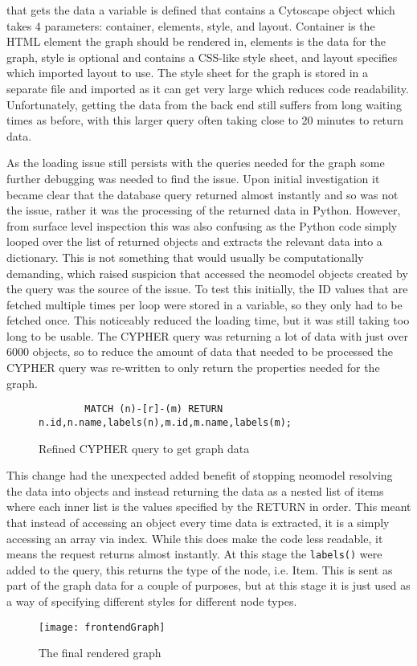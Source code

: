 that gets the data a variable is defined that contains a Cytoscape object which takes 4 parameters: container, elements, 
style, and layout. Container is the HTML element the graph should be rendered in, elements is the data for the graph, style is optional and contains a 
CSS-like style sheet, and layout specifies which imported layout to use. The style sheet for the graph is stored in a separate file and imported as 
it can get very large which reduces code readability. Unfortunately, getting the data from the back end still suffers from long waiting times as before, 
with this larger query often taking close to 20 minutes to return data.

As the loading issue still persists with the queries needed for the graph some further debugging was needed to find the issue. 
Upon initial investigation it became clear that the database query returned almost instantly and so was not the issue, rather it was the 
processing of the returned data in Python. However, from surface level inspection this was also confusing as the Python code simply looped 
over the list of returned objects and extracts the relevant data into a dictionary. This is not something that would usually be computationally demanding, which 
raised suspicion that accessed the neomodel objects created by the query was the source of the issue. To test this initially, the ID values that are fetched 
multiple times per loop were stored in a variable, so they only had to be fetched once. This noticeably reduced the loading time, but it was still taking too long 
to be usable. The CYPHER query was returning a lot of data with just over 6000 objects, so to reduce the amount of data that needed to be processed the 
CYPHER query was re-written to only return the properties needed for the graph.
\begin{figure}[!htbp]
    \begin{lstlisting}
        MATCH (n)-[r]-(m) RETURN n.id,n.name,labels(n),m.id,m.name,labels(m);
    \end{lstlisting}
    \caption{Refined CYPHER query to get graph data}
\end{figure}
This change had the unexpected added benefit of stopping neomodel resolving the data into objects and instead returning the data 
as a nested list of items where each inner list is the values specified by the RETURN in order. This meant that instead of accessing an object 
every time data is extracted, it is a simply accessing an array via index. While this does make the code less readable, it means the request returns almost instantly.
At this stage the \verb|labels()| were added to the query, this returns the type of the node, i.e. Item. This is sent as part of the graph data for a couple of purposes, 
but at this stage it is just used as a way of specifying different styles for different node types.
\begin{figure}[!htbp]
    \centering
    \texttt{[image: frontendGraph]}
    \caption{The final rendered graph}
\end{figure}


